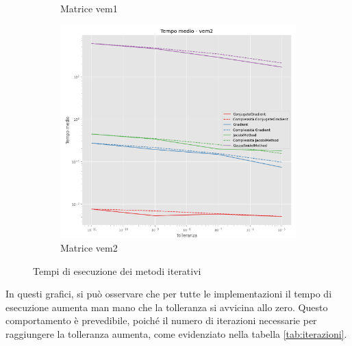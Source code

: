 \begin{figure}[!ht]
\begin{subfigure}{0.45\textwidth}
        \caption{Matrice vem1}
        \label{fig:time_vem1}
    \end{subfigure}
    \hfill
    \begin{subfigure}{0.45\textwidth}
        \centering
        \includegraphics[width=\textwidth]{./../report/Progetto_1_bis/img/time_vem2.png}
        \caption{Matrice vem2}
        \label{fig:time_vem2}
    \end{subfigure}
    \caption{Tempi di esecuzione dei metodi iterativi}
    \label{fig:time}
\end{figure}

In questi grafici, si può osservare che per tutte le implementazioni il tempo di
esecuzione aumenta man mano che la tolleranza si avvicina allo zero. Questo
comportamento è prevedibile, poiché il numero di iterazioni necessarie per
raggiungere la tolleranza aumenta, come evidenziato nella tabella \ref{tab:iterazioni}.

